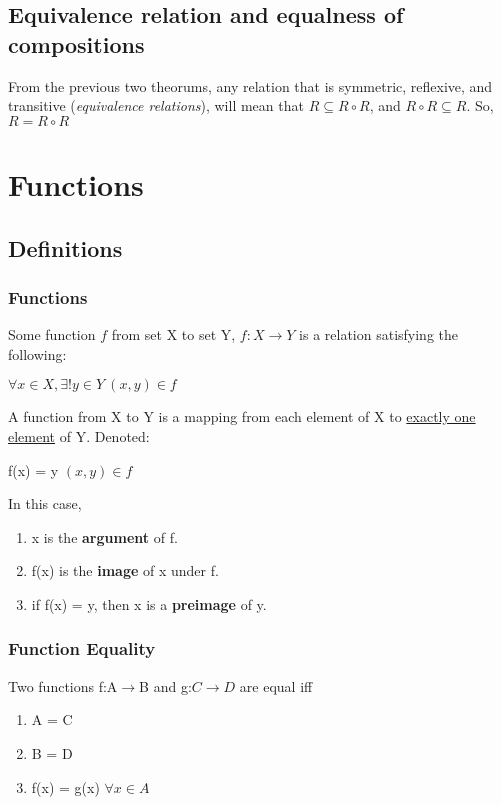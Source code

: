 \documentclass{article}
\newcommand{\sbreak}{\vspace{10pt}}
\begin{document}
\subsection{Equivalence relation and equalness of compositions}
From the previous two theorums, any relation that is symmetric, reflexive, and transitive (\textit{equivalence relations}), will mean that $R \subseteq R \circ R$, and $R \circ R \subseteq R$. So, $R = R \circ R$

\section{Functions}

\subsection{Definitions}

\subsubsection{Functions}
Some function $f$ from set X to set Y, $f:X\rightarrow Y$ is a relation satisfying the following:
\begin{center}
    $\forall x \in X, \exists!y\in Y\ (x,y)\in f$
\end{center}
A function from X to Y is a mapping from each element of X to \underline{exactly one element} of Y. Denoted:
\begin{center}
    f(x) = y  $(x,y)\in f$
\end{center}

\sbreak

In this case,
\begin{enumerate}
    \item x is the \textbf{argument} of f.
    \item f(x) is the \textbf{image} of x under f.
    \item if f(x) = y, then x is a \textbf{preimage} of y.
\end{enumerate}

\subsubsection{Function Equality}
Two functions f:A$\rightarrow$B and g:$C\rightarrow D$ are equal iff
\begin{enumerate}
    \item A = C
    \item B = D
    \item f(x) = g(x) $\forall x \in A$
\end{enumerate}
\end{document}
